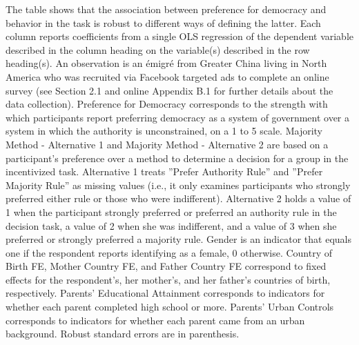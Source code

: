 \documentclass[]{article}
\begin{document}
\begin{adjustwidth}{-1cm}{-1cm}
\begin{scriptsize}
The table shows that the association between preference for democracy and behavior in the task is robust to different ways of defining the latter. Each column reports coefficients from a single OLS regression of the dependent variable described in the column heading on the variable(s) described in the row heading(s). An observation is an émigré from Greater China living in North America who was recruited via Facebook targeted ads to complete an online survey (see Section 2.1 and online Appendix B.1 for further details about the data collection). Preference for Democracy corresponds to the strength with which participants report preferring democracy as a system of government over a system in which the authority is unconstrained, on a 1 to 5 scale. Majority Method - Alternative 1 and Majority Method - Alternative 2 are based on a participant’s preference over a method to determine a decision for a group in the incentivized task. Alternative 1 treats ”Prefer Authority Rule” and ”Prefer Majority Rule” as missing values (i.e., it only examines participants who strongly preferred either rule or those who were indifferent). Alternative 2 holds a value of 1 when the participant strongly preferred or preferred an authority rule in the decision task, a value of 2 when she was indifferent, and a value of 3 when she preferred or strongly preferred a majority rule. Gender is an indicator that equals one if the respondent reports identifying as a female, 0 otherwise. Country of Birth FE, Mother Country FE, and Father Country FE correspond to fixed effects for the respondent’s, her mother’s, and her father’s countries of birth, respectively. Parents’ Educational Attainment corresponds to indicators for whether each parent completed high school or more. Parents’ Urban Controls corresponds to indicators for whether each parent came from an urban background. Robust standard errors are in parenthesis.
\end{scriptsize}
\end{adjustwidth}
\end{document}
